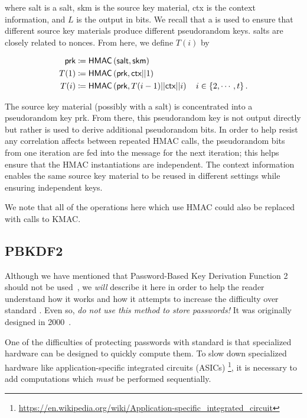 \noindent
where \textsf{salt} is a \gls{salt},
\textsf{skm} is the source key material,
\textsf{ctx} is the context information, and $L$ is the output in bits.
We recall that a  is used to ensure
that different source key materials produce different pseudorandom keys.
\Glspl{salt} are closely related to \glspl{nonce}.
From here, we define $T(i)$ by

\begin{align}
    \textsf{prk} &\coloneqq{} \textsf{HMAC}\left( \textsf{salt},\textsf{skm} \right)
            \nonumber\\
    T(1) &\coloneqq{} \textsf{HMAC}\left( \textsf{prk}, \textsf{ctx}||1 \right)
            \nonumber\\
    T(i) &\coloneqq{} \textsf{HMAC}\left( \textsf{prk},T(i-1)||
        \textsf{ctx}||i \right) \quad i\in\left\{ 2,\cdots,t \right\}.
\end{align}

\noindent
The source key material (possibly with a \gls{salt}) is concentrated
into a pseudorandom key \textsf{prk}.
From there, this pseudorandom key is not output directly
but rather is used to derive additional pseudorandom bits.
In order to help resist any correlation affects between repeated
\textsf{HMAC} calls,
the pseudorandom bits from one iteration are fed into
the message for the next iteration;
this helps ensure that the \textsf{HMAC} instantiations
are independent.
The context information enables the same source key material
to be reused in different settings while ensuring
independent keys.

We note that all of the operations here which use \textsf{HMAC}
could also be replaced with calls to \textsf{KMAC}.


\subsection{PBKDF2}
\label{app:crypto_pbkdf2}

Although we have mentioned that
Password-Based Key Derivation Function 2~\cite{rfc8018}
should not be used~\cite{blocki2018economics},
we \emph{will} describe it here in order to help the reader understand
how it works and how it attempts to increase the difficulty
over standard .
Even so, \emph{do not use this method to store passwords!}
It was originally designed in 2000~\cite{rfc2898}.

One of the difficulties of protecting passwords with standard
 is that specialized hardware
can be designed to quickly compute them.
To slow down specialized hardware like
application-specific integrated circuits (ASICs)%
\footnote{\url{https://en.wikipedia.org/wiki/Application-specific_integrated_circuit}},
it is necessary to add computations
which \emph{must} be performed sequentially.


